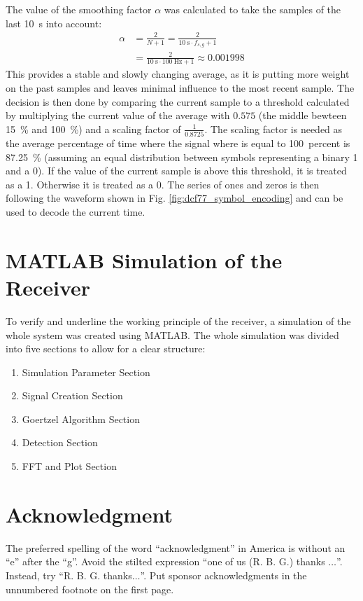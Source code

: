 \documentclass[conference]{IEEEtran}
\begin{document}
\FloatBarrier\noindent
The value of the smoothing factor $\alpha$ was calculated to take the samples of the last \SI{10}{\second} into account:
\begin{equation}
    \begin{split}
        \alpha &= \frac{2}{N + 1} = \frac{2}{\SI{10}{\second} \cdot f_{s,g} + 1}\\
        &= \frac{2}{\SI{10}{\second} \cdot \SI{100}{\hertz} + 1} \approx 0.001998
    \end{split}
\end{equation}
This provides a stable and slowly changing average, as it is putting more weight on the past samples and leaves minimal influence to the most recent sample.
The decision is then done by comparing the current sample to a threshold calculated by multiplying the current value of the average with $0.575$ (the middle bewteen \SI{15}{\percent} and \SI{100}{\percent}) and a scaling factor of $\frac{1}{0.8725}$.
The scaling factor is needed as the average percentage of time where the signal where is equal to \SI{100}{percent} is \SI{87.25}{\percent} (assuming an equal distribution between symbols representing a binary 1 and a 0).
If the value of the current sample is above this threshold, it is treated as a 1.
Otherwise it is treated as a 0.
The series of ones and zeros is then following the waveform shown in Fig. \ref{fig:dcf77_symbol_encoding} and can be used to decode the current time. 

\section{MATLAB Simulation of the Receiver}
To verify and underline the working principle of the receiver, a simulation of the whole system was created using MATLAB.
The whole simulation was divided into five sections to allow for a clear structure:
\begin{enumerate}
    \item Simulation Parameter Section
    \item Signal Creation Section
    \item Goertzel Algorithm Section
    \item Detection Section
    \item FFT and Plot Section
\end{enumerate}



\section*{Acknowledgment}
The preferred spelling of the word ``acknowledgment'' in America is without 
an ``e'' after the ``g''. Avoid the stilted expression ``one of us (R. B. 
G.) thanks $\ldots$''. Instead, try ``R. B. G. thanks$\ldots$''. Put sponsor 
acknowledgments in the unnumbered footnote on the first page.
\end{document}
